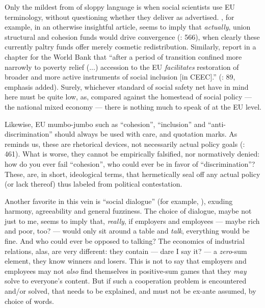 Only the mildest from of sloppy language is when social scientists use \gls{EU} terminology, without questioning whether they deliver as advertised. \citeauthor{Dehey2003}, for example, in an otherwise insightful article, seems to imply that \emph{actually}, union structural and cohesion funds would drive convergence (\citeyear{Dehey2003}: 566), when clearly these currently paltry funds offer merely cosmetic redistribution. Similarly, \citeauthor{Sipos2005} report in a chapter for the World Bank that ``after a period of transition confined more narrowly to poverty relief (...) accession to the \gls{EU} \emph{facilitates} restoration of broader and more active instruments of social inclusion [in \gls{CEEC}].'' (\citeyear{Sipos2005}: 89, emphasis added). Surely, whichever standard \citeauthor{Sipos2005} of social safety net have in mind here must be quite low, as, compared against the homestead of social policy --- the national mixed economy --- there is nothing much to speak of at the \gls{EU} level.

Likewise, \gls{EU} mumbo-jumbo such as ``cohesion'', ``inclusion'' and ``anti-discrimination'' should always be used with care, and quotation marks. As \citeauthor{Offe2003} reminds us, these are rhetorical devices, not necessarily actual policy goals (\citeyear{Offe2003}: 461). What is worse, they cannot be empirically falsified, nor normatively denied: how do you ever fail ``cohesion'', who could ever be in favor of ``discrimination''? These, are, in short, ideological terms, that hermetically seal off any actual policy (or lack thereof) thus labeled from political contestation.

Another favorite in this vein is ``social dialogue'' (for example, \citealt{Durr2009}), exuding harmony, agreeability and general fuzziness. The choice of dialogue, maybe not just to me, seems to imply that, \emph{really}, if employers and employees --- maybe rich and poor, too? --- would only sit around a table and \emph{talk}, everything would be fine. And who could ever be opposed to talking? The economics of industrial relations, alas, are very different: they contain --- dare I say it? --- a \emph{zero}-sum element, they know winners and losers. This is not to say that employers and employees may not \emph{also} find themselves in positive-sum games that they \emph{may} solve to everyone's content. But if such a cooperation problem is encountered and/or solved, that needs to be explained, and must not be ex-ante assumed, by choice of words.

